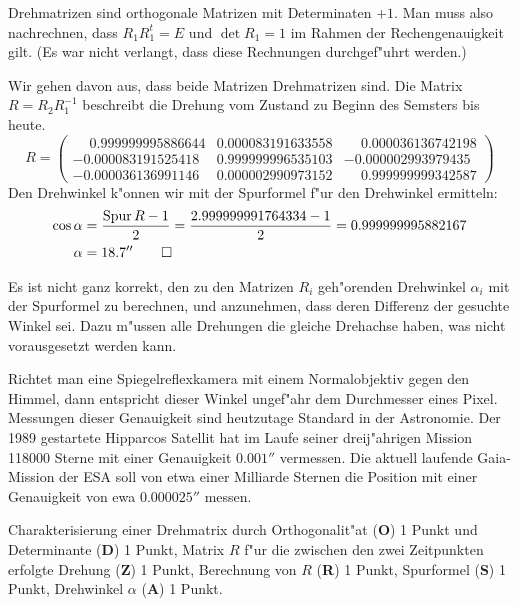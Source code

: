 \begin{loesung}
\begin{teilaufgaben}
\item
Drehmatrizen sind orthogonale Matrizen mit Determinaten $+1$.
Man muss also nachrechnen, dass $R_1R_1^t=E$ und $\det R_1=1$
im Rahmen der Rechengenauigkeit gilt. (Es war nicht verlangt,
dass diese Rechnungen durchgef"uhrt werden.)
\item
Wir gehen davon aus, dass beide Matrizen Drehmatrizen sind.
Die Matrix $R=R_2R_1^{-1}$ beschreibt die Drehung vom Zustand zu Beginn
des Semsters bis heute.
\[
R = \begin{pmatrix}
\phantom{-}0.999999995886644& 0.000083191633558&\phantom{-}0.000036136742198\\
          -0.000083191525418& 0.999999996535103&          -0.000002993979435\\
          -0.000036136991146& 0.000002990973152&\phantom{-}0.999999999342587
\end{pmatrix}
\]
Den Drehwinkel k"onnen wir mit der Spurformel f"ur den Drehwinkel ermitteln:
\begin{align*}
\cos\alpha
&=
\frac{\operatorname{Spur}R-1}2=\frac{2.999999991764334-1}2
=
0.999999995882167
\\
\alpha&=18.7''
\qedhere
\end{align*}
\end{teilaufgaben}
\end{loesung}

\begin{diskussion}
Es ist nicht ganz korrekt, den zu den Matrizen $R_i$ geh"orenden Drehwinkel
$\alpha_i$ mit der Spurformel zu berechnen, und anzunehmen, dass deren
Differenz der gesuchte Winkel sei.
Dazu m"ussen alle Drehungen die gleiche Drehachse haben, was nicht
vorausgesetzt werden kann.

Richtet man eine Spiegelreflexkamera mit einem Normalobjektiv gegen den
Himmel, dann entspricht dieser Winkel ungef"ahr dem Durchmesser eines Pixel.
Messungen dieser Genauigkeit sind heutzutage Standard in der Astronomie.
Der 1989 gestartete Hipparcos Satellit hat im Laufe seiner dreij"ahrigen
Mission 118000 Sterne mit einer Genauigkeit $0.001''$ vermessen.
Die aktuell laufende Gaia-Mission der ESA soll von etwa einer Milliarde
Sternen die Position mit einer Genauigkeit von ewa $0.000025''$ messen.
\end{diskussion}

\begin{bewertung}
Charakterisierung einer Drehmatrix durch Orthogonalit"at ({\bf O}) 1 Punkt
und Determinante ({\bf D}) 1 Punkt,
Matrix $R$ f"ur die zwischen den zwei Zeitpunkten erfolgte Drehung ({\bf Z})
1 Punkt,
Berechnung von $R$ ({\bf R}) 1 Punkt,
Spurformel ({\bf S}) 1 Punkt,
Drehwinkel $\alpha$ ({\bf A}) 1 Punkt.
\end{bewertung}

